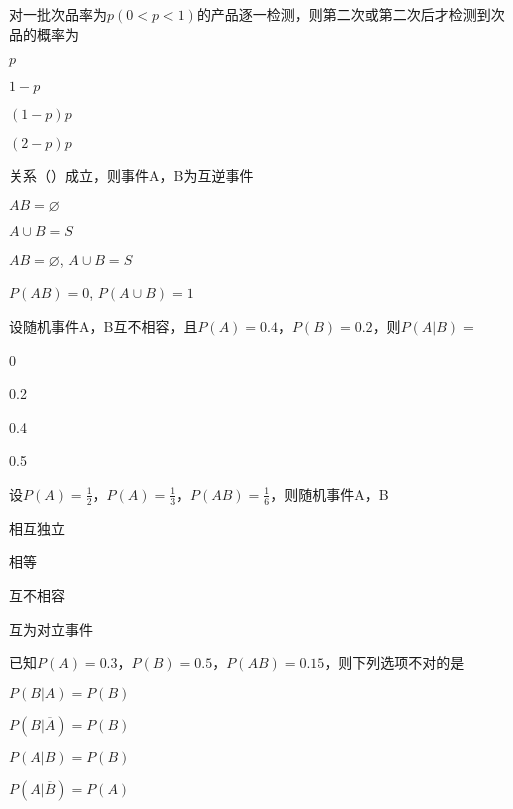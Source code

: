 \documentclass{exam-zh}
\begin{document}
\begin{question}
  对一批次品率为$p$$(0<p<1)$的产品逐一检测，则第二次或第二次后才检测到次品的概率为 \paren[B]
  \begin{choices}
    \item $p$
    \item $1-p$
    \item $(1-p)p$
    \item $(2-p)p$
  \end{choices}
\end{question}

\begin{question}
  关系（\quad ）成立，则事件A，B为互逆事件 \paren[C]
  \begin{choices}
    \item $AB=\diameter$
    \item $A\cup B=S$
    \item $AB=\diameter$, $A\cup B=S$
    \item $P\left( AB \right) =0$, $P\left( A\cup B \right) =1$
  \end{choices}
\end{question}


\begin{question}
  设随机事件A，B互不相容，且$P(A)=0.4$，$P(B)=0.2$，则$P\left( A|B \right) =$ \paren[A]
  \begin{choices}
   \item 0
   \item 0.2
   \item 0.4
   \item 0.5
  \end{choices}
\end{question}

\begin{question}
  设$P(A)=\frac{1}{2}$，$P(A)=\frac{1}{3}$，$P(AB)=\frac{1}{6}$，则随机事件A，B \paren[A]
  \begin{choices}
   \item 相互独立
   \item 相等
   \item 互不相容
   \item 互为对立事件
  \end{choices}
\end{question}

\begin{question}
  已知$P(A)=0.3$，$P(B)=0.5$，$P(AB)=0.15$，则下列选项不对的是 \paren[C]
  \begin{choices}
   \item $P(B|A)=P(B)$
   \item $P(B|\overline{A})=P(B)$
   \item $P(A|B)=P(B)$
   \item $P(A|\overline{B})=P(A)$
  \end{choices}
\end{question}
\end{document}
